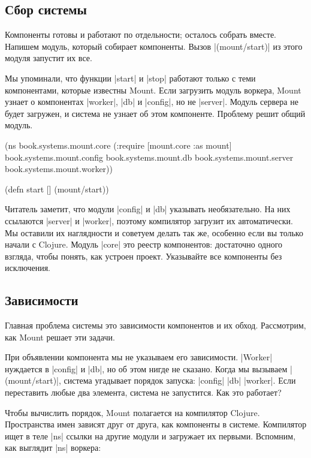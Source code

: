 \subsection{Сбор системы}

Компоненты готовы и работают по отдельности; осталось собрать вместе. Напишем
модуль, который собирает компоненты. Вызов \spverb|(mount/start)| из этого
модуля запустит их все.

Мы упоминали, что функции \spverb|start| и \spverb|stop| работают только с теми
компонентами, которые известны Mount. Если загрузить модуль воркера, Mount
узнает о компонентах \spverb|worker|, \spverb|db| и \spverb|config|, но не
\spverb|server|. Модуль сервера не будет загружен, и система не узнает об этом
компоненте. Проблему решит общий модуль.

\begin{english}
  \begin{clojure}
(ns book.systems.mount.core
  (:require
   [mount.core :as mount]
   book.systems.mount.config
   book.systems.mount.db
   book.systems.mount.server
   book.systems.mount.worker))

(defn start []
  (mount/start))
  \end{clojure}
\end{english}

Читатель заметит, что модули \spverb|config| и \spverb|db| указывать
необязательно. На них ссылаются \spverb|server| и \spverb|worker|, поэтому
компилятор загрузит их автоматически. Мы оставили их наглядности и советуем
делать так же, особенно если вы только начали с Clojure. Модуль \spverb|core|
это реестр компонентов: достаточно одного взгляда, чтобы понять, как устроен
проект. Указывайте все компоненты без исключения.

\subsection{Зависимости}

Главная проблема системы это зависимости компонентов и их обход. Рассмотрим, как
Mount решает эти задачи.

При объявлении компонента мы не указываем его зависимости. \spverb|Worker|
нуждается в \spverb|config| и \spverb|db|, но об этом нигде не сказано. Когда мы
вызываем \spverb|(mount/start)|, система угадывает порядок запуска:
\spverb|config| \arr{} \spverb|db| \arr{} \spverb|worker|. Если переставить
любые два элемента, система не запустится. Как это работает?

Чтобы вычислить порядок, Mount полагается на компилятор Clojure. Пространства
имен зависят друг от друга, как компоненты в системе. Компилятор ищет в теле
\spverb|ns| ссылки на другие модули и загружает их первыми. Вспомним, как
выглядит \spverb|ns| воркера:


